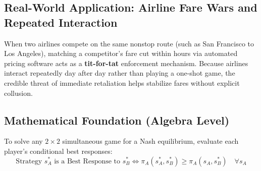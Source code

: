 \documentclass[11pt,letterpaper]{article}
\begin{document}
\subsection*{Real-World Application: Airline Fare Wars and Repeated Interaction}
When two airlines compete on the same nonstop route (such as San Francisco to Los Angeles), matching a competitor's fare cut within hours via automated pricing software acts as a \textbf{tit-for-tat} enforcement mechanism. Because airlines interact repeatedly day after day rather than playing a one-shot game, the credible threat of immediate retaliation helps stabilize fares without explicit collusion.

\subsection*{Mathematical Foundation (Algebra Level)}
To solve any $2 \times 2$ simultaneous game for a Nash equilibrium, evaluate each player's conditional best responses:
\begin{equation}
\text{Strategy } s_A^* \text{ is a Best Response to } s_B^* \iff \pi_A(s_A^*, s_B^*) \ge \pi_A(s_A, s_B^*) \quad \forall s_A
\end{equation}
\end{document}
